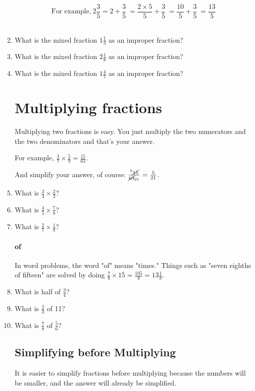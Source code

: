 \documentclass[14pt]{article}
\begin{document}
\begin{enumerate}
$$\textrm{For example,}\ 2 \frac{3}{5} = 2 + \frac{3}{5}\
= \frac{2\times5}{5} + \frac{3}{5}\
= \frac{10}{5} + \frac{3}{5}\ = \frac{13}{5}$$\\

\item What is the mixed fraction $1 \frac{1}{3}$ as an improper fraction?
\item What is the mixed fraction $2 \frac{1}{8}$ as an improper fraction?
\item What is the mixed fraction $1 \frac{4}{7}$ as an improper fraction?

\newpage

\section{Multiplying fractions}
Multiplying two fractions is easy. You just multiply the two numerators and the two denominators and that’s your answer.

For example, $\frac{3}{7} \times \frac{5}{9} = \frac{15}{63}$.

And simplify your answer, of course: $\frac{^5\cancel{15}}{\cancel{63}_{21}} = \frac{5}{21}$.\\

\item What is $\frac{3}{4} \times \frac{2}{3}$?
\item What is $\frac{4}{5} \times \frac{7}{8}$?
\item What is $\frac{2}{7} \times \frac{1}{8}$?

\paragraph{of}
In word problems, the word "of" means "times." Things such as "seven eighths of fifteen" are solved by doing $\frac{7}{8}\times15=\frac{105}{8}=13\frac{1}{8}$.\\

\item What is half of $\frac{3}{4}$?
\item What is $\frac{2}{3}$ of 11?
\item What is $\frac{7}{8}$ of $\frac{5}{6}$?

\subsection*{Simplifying before Multiplying}
It is easier to simplify fractions before multiplying because the numbers will be smaller, and the answer will already be simplified.


\end{enumerate}
\end{document}
